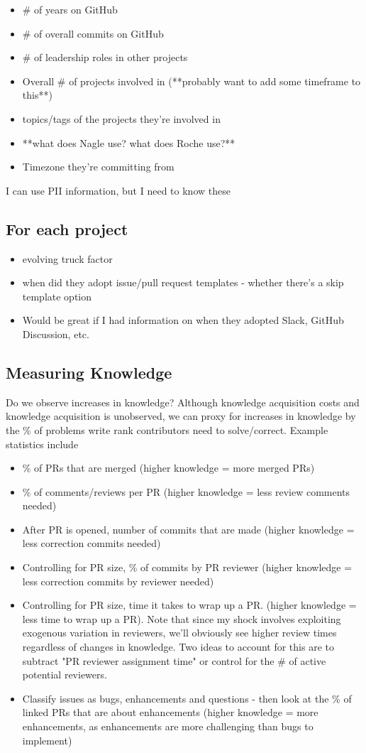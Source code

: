 \documentclass[12pt,notitlepage]{article}
\begin{document}
\begin{itemize}
    \item \# of years on GitHub
    \item \# of overall commits on GitHub
    \item \# of leadership roles in other projects
    \item Overall \# of projects involved in (**probably want to add some timeframe to this**)
    \item topics/tags of the projects they're involved in
    \item **what does Nagle use? what does Roche use?**
    \item Timezone they're committing from
\end{itemize}
I can use PII information, but I need to know these


\subsection*{For each project}
\begin{itemize}
    \item evolving truck factor
    \item when did they adopt issue/pull request templates - whether there's a skip template option
    \item Would be great if I had information on when they adopted Slack, GitHub Discussion, etc.
\end{itemize}

\subsection{Measuring Knowledge} \label{measuring_knowledge}
Do we observe increases in knowledge? Although knowledge acquisition costs and knowledge acquisition is unobserved, we can proxy for increases in knowledge by the \% of problems write rank contributors need to solve/correct. Example statistics include
\begin{itemize}
    \item \% of PRs that are merged (higher knowledge = more merged PRs)
    \item \% of comments/reviews per PR (higher knowledge = less review comments needed)
    \item After PR is opened, number of commits that are made (higher knowledge = less correction commits needed)
    \item Controlling for PR size, \% of commits by PR reviewer (higher knowledge = less correction commits by reviewer needed)
    \item Controlling for PR size, time it takes to wrap up a PR. (higher knowledge = less time to wrap up a PR). Note that since my shock involves exploiting exogenous variation in reviewers, we'll obviously see higher review times regardless of changes in knowledge. Two ideas to account for this are to subtract "PR reviewer assignment time" or control for the \# of active potential reviewers. 
    \item Classify issues as bugs, enhancements and questions - then look at the \% of linked PRs that are about enhancements (higher knowledge = more enhancements, as enhancements are more challenging than bugs to implement)
\end{itemize}
\end{document}
